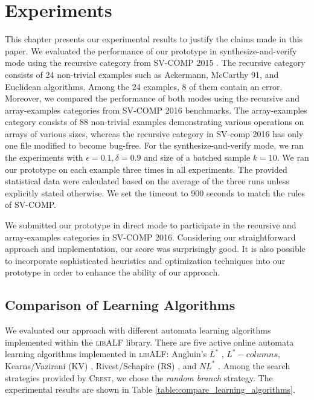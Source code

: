 \newcommand{\Mem}{\textit{Mem} }
\newcommand{\Equ}{\textit{Equ} }
\newcommand{\safe}{S}
\newcommand{\unsafe}{U}
\newcommand{\unknown}{?}
\newcommand{\exception}{E}
\newcommand{\timeout}{T.O.}
\newcommand{\unknownmark}{\ensuremath{^?}}
\newcommand{\wrongmark}{\ensuremath{^!}}

\chapter{Experiments}\label{ch:experiments}

This chapter presents our experimental results to justify the claims made in this paper. We evaluated the performance of our prototype in synthesize-and-verify mode using the recursive category from SV-COMP 2015 \cite{svcomp15} \cite{svcomp-benchmarks}. The recursive category consists of 24 non-trivial examples such as Ackermann, McCarthy 91, and Euclidean algorithms. Among the 24 examples, 8 of them contain an error. Moreover, we compared the performance of both modes using the recursive and array-examples categories from SV-COMP 2016 \cite{svcomp16} benchmarks. The array-examples category consists of 88 non-trivial examples demonstrating various operations on arrays of various sizes, whereas the recursive category in SV-comp 2016 has only one file modified to become bug-free. For the synthesize-and-verify mode, we ran the experiments with $\epsilon = 0.1, \delta = 0.9$ and size of a batched sample $k = 10$. We ran our prototype on each example three times in all experiments. The provided statistical data were calculated based on the average of the three runs unless explicitly stated otherwise. We set the timeout to 900 seconds to match the rules of SV-COMP.  

We submitted our prototype in direct mode to participate in the recursive and array-examples categories in SV-COMP 2016. Considering our straightforward approach and implementation, our score was surprisingly good. It is also possible to incorporate sophisticated heuristics and optimization techniques into our prototype in order to enhance the ability of our approach.

\section{Comparison of Learning Algorithms}\label{sec:compare_learning_algorithms}

We evaluated our approach with different automata learning algorithms implemented within the \textsc{libALF} library. There are five active online automata learning algorithms implemented in \textsc{libALF}: Angluin's $L^\ast$ \cite{Angluin87}, $L^\ast-columns$, Kearns/Vazirani (KV) \cite{KearnsV94}, Rivest/Schapire (RS) \cite{RivestS93}, and $NL^\ast$ \cite{BolligHKL09}. Among the search strategies provided by \textsc{Crest}, we chose the \emph{random branch} strategy. The experimental results are shown in Table \ref{table:compare_learning_algorithms}.

